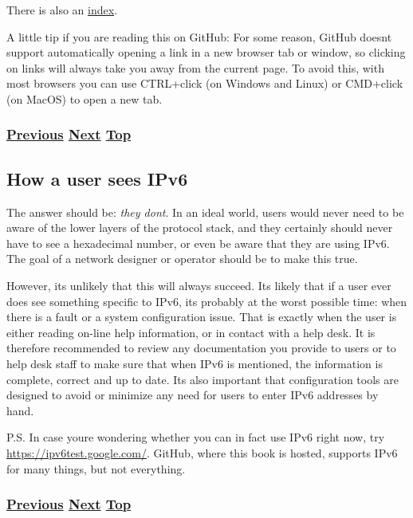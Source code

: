 \documentclass[
]{article}
\begin{document}
There is also an \hyperref[book6-main-index]{index}.

A little tip if you are reading this on GitHub: For some reason, GitHub
doesn\textquotesingle t support automatically opening a link in a new
browser tab or window, so clicking on links will always take you away
from the current page. To avoid this, with most browsers you can use
CTRL+click (on Windows and Linux) or CMD+click (on MacOS) to open a new
tab.

\subsubsection{\texorpdfstring{\hyperref[foreword]{Previous}
\hyperref[how-a-user-sees-ipv6]{Next}
\hyperref[introduction-and-foreword]{Top}}{Previous Next Top}}\label{previous-next-top}

\pagebreak

\subsection{How a user sees IPv6}\label{how-a-user-sees-ipv6}

The answer should be: \emph{they don\textquotesingle t}. In an ideal
world, users would never need to be aware of the lower layers of the
protocol stack, and they certainly should never have to see a
hexadecimal number, or even be aware that they are using IPv6. The goal
of a network designer or operator should be to make this true.

However, it\textquotesingle s unlikely that this will always succeed.
It\textquotesingle s likely that if a user ever does see something
specific to IPv6, it\textquotesingle s probably at the worst possible
time: when there is a fault or a system configuration issue. That is
exactly when the user is either reading on-line help information, or in
contact with a help desk. It is therefore recommended to review any
documentation you provide to users or to help desk staff to make sure
that when IPv6 is mentioned, the information is complete, correct and up
to date. It\textquotesingle s also important that configuration tools
are designed to avoid or minimize any need for users to enter IPv6
addresses by hand.

P.S. In case you\textquotesingle re wondering whether you can in fact
use IPv6 right now, try \url{https://ipv6test.google.com/}. GitHub,
where this book is hosted, supports IPv6 for many things, but not
everything.

\subsubsection{\texorpdfstring{\hyperref[how-to-use-this-book]{Previous}
\hyperref[how-an-application-programmer-sees-ipv6]{Next}
\hyperref[introduction-and-foreword]{Top}}{Previous Next Top}}\label{previous-next-top-1}
\end{document}
